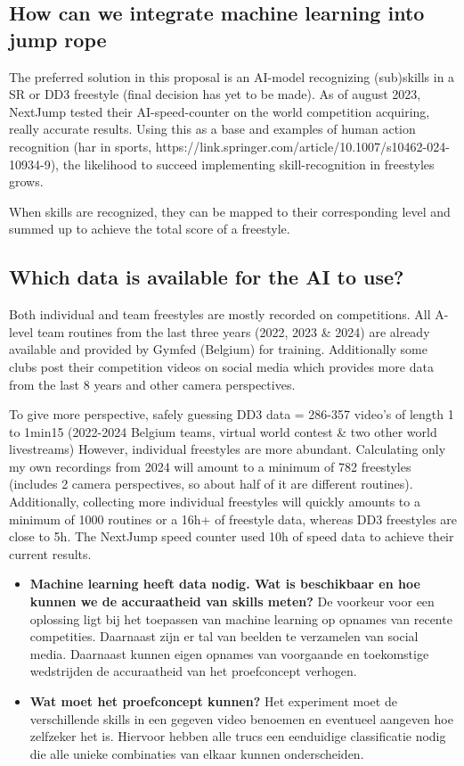 \subsection{How can we integrate machine learning into jump rope}

The preferred solution in this proposal is an AI-model recognizing (sub)skills in a SR or DD3 freestyle (final decision has yet to be made). As of august 2023, NextJump tested their AI-speed-counter on the world competition acquiring, really accurate results.
Using this as a base and examples of human action recognition (har in sports, https://link.springer.com/article/10.1007/s10462-024-10934-9), the likelihood to succeed implementing skill-recognition in freestyles grows.

When skills are recognized, they can be mapped to their corresponding level and summed up to achieve the total score of a freestyle.

\subsection{Which data is available for the AI to use?}

Both individual and team freestyles are mostly recorded on competitions. All A-level team routines from the last three years (2022, 2023 \& 2024) are already available and provided by Gymfed (Belgium) for training. Additionally some clubs post their competition videos on social media which provides more data from the last 8 years and other camera perspectives.

To give more perspective, safely guessing DD3 data = 286-357 video's of length 1 to 1min15 (2022-2024 Belgium teams, virtual world contest \& two other world livestreams)
However, individual freestyles are more abundant. Calculating only my own recordings from 2024 will amount to a minimum of 782 freestyles (includes 2 camera perspectives, so about half of it are different routines). Additionally, collecting more individual freestyles will quickly amounts to a minimum of 1000 routines or a 16h+ of freestyle data, whereas DD3 freestyles are close to 5h. The NextJump speed counter used 10h of speed data to achieve their current results.

\begin{itemize}
    \item \textbf{Machine learning heeft data nodig. Wat is beschikbaar en hoe kunnen we de accuraatheid van skills meten?}
    De voorkeur voor een oplossing ligt bij het toepassen van machine learning op opnames van recente competities. Daarnaast zijn er tal van beelden te verzamelen van social media. Daarnaast kunnen eigen opnames van voorgaande en toekomstige wedstrijden de accuraatheid van het proefconcept verhogen.
    
    \item \textbf{Wat moet het proefconcept kunnen?}
    Het experiment moet de verschillende skills in een gegeven video benoemen en eventueel aangeven hoe zelfzeker het is. Hiervoor hebben alle trucs een eenduidige classificatie nodig die alle unieke combinaties van elkaar kunnen onderscheiden.
\end{itemize}

